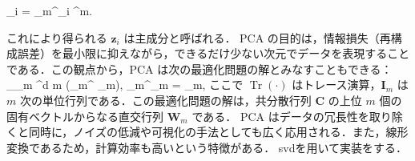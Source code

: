    _i = _m^\top {}_i \in {}^m.
   
   これにより得られる $\mathbf{z}_i$ は主成分と呼ばれる．
PCA の目的は，情報損失（再構成誤差）を最小限に抑えながら，できるだけ少ない次元でデータを表現することである．この観点から，PCA は次の最適化問題の解とみなすこともできる：
\max_{_m \in {}^{d \times m}} (_m^\top {} _m), \quad {} _m^\top {}_m = _m,
ここで $\operatorname{Tr}(\cdot)$ はトレース演算，$\mathbf{I}_m$ は $m$ 次の単位行列である．この最適化問題の解は，共分散行列 $\mathbf{C}$ の上位 $m$ 個の固有ベクトルからなる直交行列 $\mathbf{W}_m$ である．
PCA はデータの冗長性を取り除くと同時に，ノイズの低減や可視化の手法としても広く応用される．また，線形変換であるため，計算効率も高いという特徴がある．
svdを用いて実装をする．
